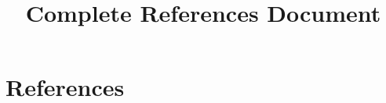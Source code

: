 \documentclass{article}
\title{Complete References Document}
\begin{document}
\section{References}

\cite{turing1950,shannon1948,knuth1984,lamport1994, rivest1978,diffie1976,stallings2017,daemen2002,elgamal1985,dsa1991,
cormen2009,merkle1989,goldwasser1984,boneh1998,rivest1992,dworkin2001,menezes1996,kahn1967,bellare1993,rogaway2004,
shamir1979,diffie2019,rivest1997,menezes2018,bellare2000,boneh2001,katz2015,diffie1992,feldhofer2004,stallings2005}




\end{document}
